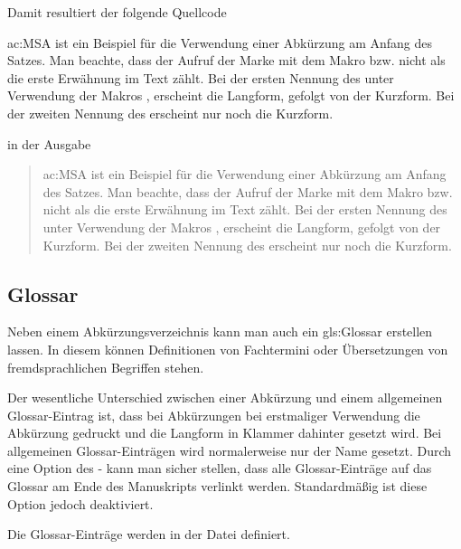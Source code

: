 Damit resultiert der folgende Quellcode
\begin{latex}[caption={Verwendung von Abkürzungen},label={lst:AcronymUsage}]
    \Acf{ac:MSA} ist ein Beispiel für die Verwendung einer
    Abkürzung am Anfang des Satzes. Man beachte, dass
    der Aufruf der Marke mit dem Makro  bzw. 
    nicht als die erste Erwähnung im Text zählt.
    Bei der ersten Nennung des  unter Verwendung
    der Makros ,  \oae erscheint die Langform,
    gefolgt von der Kurzform. Bei der zweiten Nennung des
     erscheint nur noch die Kurzform.
\end{latex}
%
in der Ausgabe
%
\begin{quote}
\Acf{ac:MSA} ist ein Beispiel für die Verwendung einer
Abkürzung am Anfang des Satzes. Man beachte, dass
der Aufruf der Marke mit dem Makro  bzw. 
nicht als die erste Erwähnung im Text zählt.
Bei der ersten Nennung des  unter Verwendung
der Makros ,  \oae erscheint die Langform,
gefolgt von der Kurzform. Bei der zweiten Nennung des
 erscheint nur noch die Kurzform.
\end{quote}


\subsection{Glossar}%
\label{sec:Glossar}

Neben einem Abkürzungsverzeichnis kann man auch ein
\gls{gls:Glossar} erstellen lassen.
In diesem können Definitionen von Fachtermini oder
Übersetzungen von fremdsprachlichen Begriffen stehen.

Der wesentliche Unterschied zwischen einer Abkürzung und einem allgemeinen Glossar-Eintrag ist,
dass bei Abkürzungen bei erstmaliger Verwendung die Abkürzung gedruckt und die Langform in Klammer dahinter gesetzt wird.
Bei allgemeinen Glossar-Einträgen wird normalerweise nur der Name gesetzt.
Durch eine Option des - kann man sicher stellen,
dass alle Glossar-Einträge auf das Glossar am Ende des Manuskripts verlinkt werden.
Standardmäßig ist diese Option jedoch deaktiviert.

Die Glossar-Einträge werden in der Datei   definiert.

